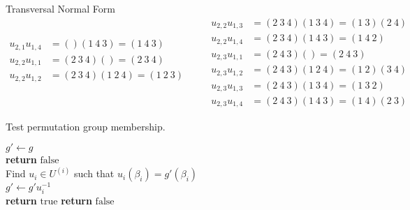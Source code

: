 \begin{exmp}[label=exmp:transversal_normal_form]{Transversal Normal Form}
\begin{equation*}
\begin{split}
      u_{2,1} u_{1,4} &= () (1\ 4\ 3)        = (1\ 4\ 3) \\
      u_{2,2} u_{1,1} &= (2\ 3\ 4) ()        = (2\ 3\ 4) \\
      u_{2,2} u_{1,2} &= (2\ 3\ 4) (1\ 2\ 4) = (1\ 2\ 3) \\
    \end{split}
    \qquad
    \begin{split}
      u_{2,2} u_{1,3} &= (2\ 3\ 4) (1\ 3\ 4) = (1\ 3)(2\ 4) \\
      u_{2,2} u_{1,4} &= (2\ 3\ 4) (1\ 4\ 3) = (1\ 4\ 2) \\
      u_{2,3} u_{1,1} &= (2\ 4\ 3) ()        = (2\ 4\ 3) \\
      u_{2,3} u_{1,2} &= (2\ 4\ 3) (1\ 2\ 4) = (1\ 2)(3\ 4) \\
      u_{2,3} u_{1,3} &= (2\ 4\ 3) (1\ 3\ 4) = (1\ 3\ 2) \\
      u_{2,3} u_{1,4} &= (2\ 4\ 3) (1\ 4\ 3) = (1\ 4)(2\ 3)
    \end{split}
  \end{equation*}
  \normalsize
\end{exmp}
%
\begin{algorithm}
  \caption{Test permutation group membership.}
  \label{alg:is_member}
  \begin{algorithmic}[1]
       \State $g' \gets g$
       \\
            \State \textbf{return} $\mathrm{false}$
          \EndIf
          \\
          \State Find $u_i \in U^{(i)}$ such that $u_i(\beta_i) = g'(\beta_i)$
          \\
          \State $g' \gets g' u_i^{-1}$
       \EndFor
       \\
         \State \textbf{return} $\mathrm{true}$
       \Else
         \State \textbf{return} $\mathrm{false}$
       \EndIf
    \EndProcedure
  \end{algorithmic}
\end{algorithm}

